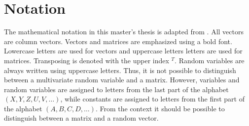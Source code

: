 \section*{Notation}

The mathematical notation in this master's thesis is adapted from \cite{Madsen_2010}. All vectors are column vectors. Vectors and matrices are emphasized using a bold font. Lowercase letters are used for vectors and uppercase letters letters are used for matrices. Transposing is denoted with the upper index $^T$. Random variables are always written using uppercase letters. Thus, it is not possible to distinguish between a multivariate random variable and a matrix. However, variables and random variables are assigned to letters from the last part of the alphabet $(X, Y, Z, U, V, \dots)$, while constants are assigned to letters from the first part of the alphabet $(A, B, C, D, \dots)$. From the context it should be possible to distinguish between a matrix and a random vector.